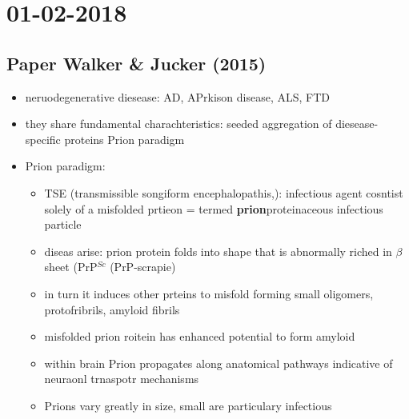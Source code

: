 \documentclass[fleqn]{article}\usepackage{caption}
\begin{document}
\section{01-02-2018}
\subsection{Paper Walker \& Jucker (2015)}
\begin{itemize}
\item neruodegenerative diesease: AD, APrkison disease, ALS, FTD
\item they share fundamental charachteristics: seeded aggregation of diesease-specific proteins Prion paradigm
\item Prion paradigm:
\begin{itemize}
\item TSE (transmissible songiform encephalopathis,): infectious agent cosntist solely of a misfolded prtieon = termed \textbf{prion}proteinaceous infectious particle
\item diseas arise: prion protein folds into shape that is abnormally riched in $\beta$ sheet (PrP$^{Sc}$ (PrP-scrapie)
\item in turn it induces other prteins to misfold forming small oligomers, protofribrils, amyloid fibrils
\item misfolded prion roitein has enhanced potential to form amyloid
\item within brain Prion propagates along anatomical pathways indicative of neuraonl trnaspotr mechanisms
\item Prions vary greatly in size, small are particulary infectious
\end{itemize}


\end{itemize}
\end{document}
